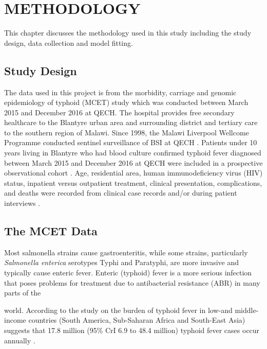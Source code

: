 
\chapter{METHODOLOGY}

This chapter discusses the methodology used in this study including the study design, data collection and model fitting.

\section{Study Design}

The data used in this project is from the morbidity, carriage and genomic epidemiology of typhoid (MCET) study which was conducted between March 2015 and December 2016 at QECH. The hospital provides free secondary healthcare to the Blantyre urban area and surrounding district and tertiary care to the southern region of Malawi. Since 1998, the Malawi Liverpool Wellcome Programme conducted sentinel surveillance of BSI at QECH \citep{Musicha:2017}. Patients under 10 years living in Blantyre who had blood culture confirmed typhoid fever diagnosed between March 2015 and December 2016 at QECH were included in a prospective observational cohort \citep{Feasey:2015} . Age, residential area, human immunodeficiency virus (HIV) status, inpatient versus outpatient treatment, clinical presentation, complications, and deaths were recorded from clinical case records and/or during patient interviews \citep{Feasey:2015}.

\section{The MCET Data}

Most salmonella strains cause gastroenteritis, while some strains, particularly \textit{Salmonella enterica} serotypes Typhi and Paratyphi, are more invasive and typically cause enteric fever. Enteric (typhoid) fever is a more serious infection that poses problems for treatment due to antibacterial resistance (ABR) in many parts of the 

\restoregeometry

world. According to the study on the burden of typhoid fever in low-and middle-income countries (South America, Sub-Saharan Africa and South-East Asia) suggests that 17.8 million (95\% CrI 6.9 to 48.4 million) typhoid fever cases occur annually \citep{Antillon:2017}.

